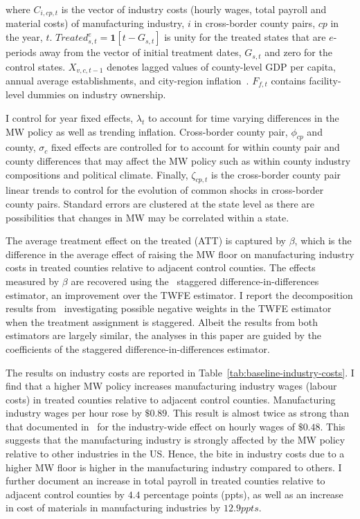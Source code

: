 \documentclass[authoryear, preprint, twocolumn, 1p]{elsarticle}
\begin{document}
    where $C_{i,cp,t}$ is the vector of industry costs (hourly wages, total payroll and material costs) of manufacturing industry, $i$ in cross-border county pairs, $cp$ in the year, $t$. $Treated_{s,t}^e = \textbf{1}[t - G_{s,t}]$ is unity for the treated states that are $e$-periods away from the vector of initial treatment dates, $G_{s,t}$ and zero for the control states. $X_{v,c,t-1}$ denotes lagged values of county-level GDP per capita, annual average establishments, and city-region inflation~\citep{gopalan2021state, dube2010minimum, clemens2019making}. $F_{f,t}$ contains facility-level dummies on industry ownership.

    I control for year fixed effects, $\lambda_{t}$ to account for time varying differences in the MW policy as well as trending inflation. Cross-border county pair, $\phi_{cp}$ and county, $\sigma_{c}$ fixed effects are controlled for to account for within county pair and county differences that may affect the MW policy such as within county industry compositions and political climate. Finally, $\zeta_{cp,t}$ is the cross-border county pair linear trends to control for the evolution of common shocks in cross-border county pairs. Standard errors are clustered at the state level as there are possibilities that changes in MW may be correlated within a state.
    

    The average treatment effect on the treated (ATT) is captured by $\beta$, which is the difference in the average effect of raising the MW floor on manufacturing industry costs in treated counties relative to adjacent control counties. The effects measured by $\beta$ are recovered using the~\citet{sun2021estimating} staggered difference-in-differences estimator, an improvement over the TWFE estimator. I report the decomposition results from~\citet{de2020two} investigating possible negative weights in the TWFE estimator when the treatment assignment is staggered. Albeit the results from both estimators are largely similar, the analyses in this paper are guided by the coefficients of the staggered difference-in-differences estimator.

    The results on industry costs are reported in Table~\ref{tab:baseline-industry-costs}. I find that a higher MW policy increases manufacturing industry wages (labour costs) in treated counties relative to adjacent control counties. Manufacturing industry wages per hour rose by $\$0.89$. This result is almost twice as strong than that documented in~\citet{gopalan2021state} for the industry-wide effect on hourly wages of $\$0.48$. This suggests that the manufacturing industry is strongly affected by the MW policy relative to other industries in the US. Hence, the bite in industry costs due to a higher MW floor is higher in the manufacturing industry compared to others. I further document an increase in total payroll in treated counties relative to adjacent control counties by $4.4$ percentage points (ppts), as well as an increase in cost of materials in manufacturing industries by $12.9ppts$.
\end{document}
